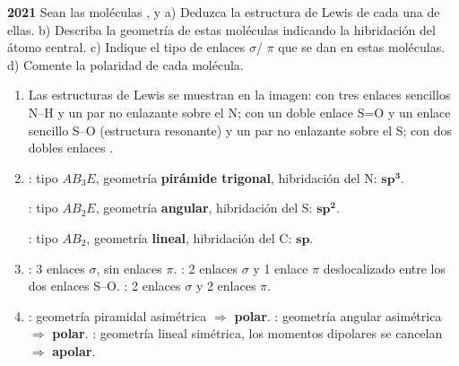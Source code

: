 \begin{exerciseEVAU}
    \textbf{2021} Sean las moléculas ,  y  a) Deduzca la estructura de Lewis de cada una de ellas. b) Describa la geometría de estas moléculas indicando la hibridación del átomo central. c) Indique el tipo de enlaces $\sigma$/ $\pi$ que se dan en estas moléculas. d) Comente la polaridad de cada molécula.

    \begin{solu}


        \begin{enumerate}[label=\letraminuscula]
            \item Las estructuras de Lewis se muestran en la imagen:  con tres enlaces sencillos N--H y un par no enlazante sobre el N;  con un doble enlace S=O y un enlace sencillo S--O (estructura resonante) y un par no enlazante sobre el S;  con dos dobles enlaces .

            \item \textbf{}: tipo \(AB_3E\), geometría \textbf{pirámide trigonal}, hibridación del N: \(\bm{sp^3}\).

            \textbf{}: tipo \(AB_2E\), geometría \textbf{angular}, hibridación del S: \(\bm{sp^2}\).

            \textbf{}: tipo \(AB_2\), geometría \textbf{lineal}, hibridación del C: \(\bm{sp}\).

            \item \textbf{}: 3 enlaces \(\sigma\), sin enlaces \(\pi\). \textbf{}: 2 enlaces \(\sigma\) y 1 enlace \(\pi\) deslocalizado entre los dos enlaces S--O. \textbf{}: 2 enlaces \(\sigma\) y 2 enlaces \(\pi\).

            \item \textbf{}: geometría piramidal asimétrica $\Rightarrow$ \textbf{polar}. \textbf{}: geometría angular asimétrica $\Rightarrow$ \textbf{polar}. \textbf{}: geometría lineal simétrica, los momentos dipolares se cancelan $\Rightarrow$ \textbf{apolar}.
        \end{enumerate}
    \end{solu}
\end{exerciseEVAU}


